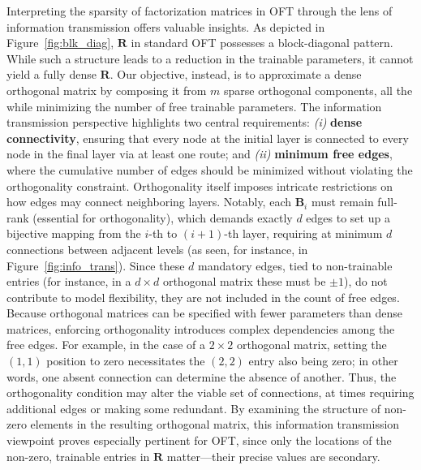 Interpreting the sparsity of factorization matrices in OFT through the lens of information transmission offers valuable insights. As depicted in Figure~\ref{fig:blk_diag}, $\bm{R}$ in standard OFT possesses a block-diagonal pattern. While such a structure leads to a reduction in the trainable parameters, it cannot yield a fully dense $\bm{R}$. Our objective, instead, is to approximate a dense orthogonal matrix by composing it from $m$ sparse orthogonal components, all the while minimizing the number of free trainable parameters. The information transmission perspective highlights two central requirements: \emph{(i)} \textbf{dense connectivity}, ensuring that every node at the initial layer is connected to every node in the final layer via at least one route; and \emph{(ii)} \textbf{minimum free edges}, where the cumulative number of edges should be minimized without violating the orthogonality constraint. Orthogonality itself imposes intricate restrictions on how edges may connect neighboring layers. Notably, each $\bm{B}_i$ must remain full-rank (essential for orthogonality), which demands exactly $d$ edges to set up a bijective mapping from the $i$-th to $(i+1)$-th layer, requiring at minimum $d$ connections between adjacent levels (as seen, for instance, in Figure~\ref{fig:info_trans}). Since these $d$ mandatory edges, tied to non-trainable entries (for instance, in a $d\times d$ orthogonal matrix these must be $\pm 1$), do not contribute to model flexibility, they are not included in the count of free edges. Because orthogonal matrices can be specified with fewer parameters than dense matrices, enforcing orthogonality introduces complex dependencies among the free edges. For example, in the case of a $2\times 2$ orthogonal matrix, setting the $(1,1)$ position to zero necessitates the $(2,2)$ entry also being zero; in other words, one absent connection can determine the absence of another. Thus, the orthogonality condition may alter the viable set of connections, at times requiring additional edges or making some redundant. By examining the structure of non-zero elements in the resulting orthogonal matrix, this information transmission viewpoint proves especially pertinent for OFT, since only the locations of the non-zero, trainable entries in $\bm{R}$ matter—their precise values are secondary.

